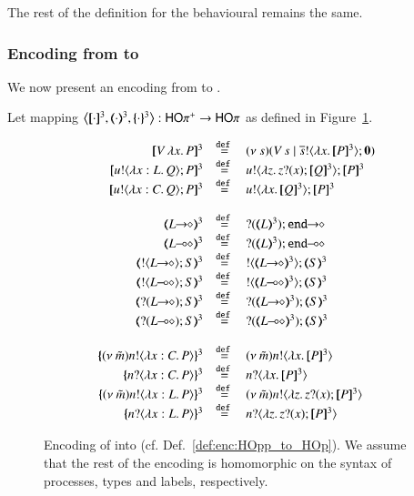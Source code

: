 \noi The rest of the definition for the behavioural remains the same.

\subsubsection{Encoding from \HOpp to \HOp}

We now present an encoding from \HOpp to \HOp.
%
\begin{definition}\rm
	\label{def:enc:HOpp_to_HOp}
	Let mapping $\enco{\pmap{\cdot}{3}, \tmap{\cdot}{3}, \mapa{\cdot}^{3}}: \HOpp \to \HOp$
	as defined in Figure~\ref{fig:enc:HOpp_to_HOp}.
\end{definition}
%
\begin{figure}[t]
	\[
	\begin{array}{rcl}
		\pmap{\appl{V}{\abs{x} P}}{3} &\defeq& \newsp{s}{\appl{V}{s} \Par \bout{\dual{s}}{\abs{x} \pmap{P}{3}} \inact}
		\\
		\pmap{\bout{u}{\abs{x: L}{Q}} P}{3} &\defeq& \bout{u}{\abs{z}{\binp{z}{x} \pmap{Q}{3}}} \pmap{P}{3}
		\\
		\pmap{\bout{u}{\abs{x: C}{Q}} P}{3} &\defeq& \bout{u}{\abs{x}{\pmap{Q}{3}}} \pmap{P}{3}
		\\
		\\
		\tmap{\shot{L}}{3} &\defeq& \shot{\btinp{\tmap{L}{3}} \tinact}
		\\
		\tmap{\lhot{L}}{3} &\defeq& \lhot{\btinp{\tmap{L}{3}} \tinact}
		\\
		\tmap{\btout{\shot{L}} S}{3} &\defeq& \btout{\tmap{\shot{L}}{3}} \tmap{S}{3}
		\\
		\tmap{\btout{\lhot{L}} S}{3} &\defeq& \btout{\tmap{\lhot{L}}{3}} \tmap{S}{3}
		\\
		\tmap{\btinp{\shot{L}} S}{3} &\defeq& \btinp{\tmap{\shot{L}}{3}} \tmap{S}{3}
		\\
		\tmap{\btinp{\lhot{L}} S}{3} &\defeq& \btinp{\tmap{\lhot{L}}{3}} \tmap{S}{3}
		\\
		\\
		\mapa{\news{\tilde{m}} \bactout{n}{\abs{x:C}{P}}}^{3} &\defeq& \news{\tilde{m}} \bactout{n}{\abs{x}{\pmap{P}{3}}}
		\\
		\mapa{\bactinp{n}{\abs{x:C}{P}}}^{3} &\defeq& \bactinp{n}{\abs{x}{\pmap{P}{3}}}
		\\
		\mapa{\news{\tilde{m}} \bactout{n}{\abs{x:L}{P}}}^{3} &\defeq& \news{\tilde{m}} \bactout{n}{\abs{z}{\binp{z}{x} \pmap{P}{3}}}
		\\
		\mapa{\bactinp{n}{\abs{x:L}{P}}}^{3} &\defeq& \bactinp{n}{\abs{z}{\binp{z}{x} \pmap{P}{3}}}

	\end{array}
	\]
%
	\caption{Encoding of \HOpp into \HOp (cf. Def.~\ref{def:enc:HOpp_to_HOp}).
	We assume that the rest of the encoding is homomorphic on the syntax of
	processes, types and labels, respectively. \label{fig:enc:HOpp_to_HOp}}
\end{figure}

